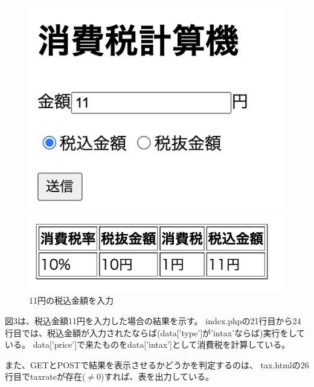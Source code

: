 \documentclass[12pt]{jarticle}
\begin{document}
\begin{figure}[h]
    \begin{minipage}{0.5\hsize}
        \begin{center}
            \includegraphics[scale=0.3]{kadai2_1_4.png}
        \end{center}
    \end{minipage}
    \begin{minipage}{0.5\hsize}
        \begin{center}
            \includegraphics[scale=0.4]{kadai2_1_5.png}
        \end{center}
    \end{minipage}
    \caption{11円の税込金額を入力}
\end{figure}

図3は、税込金額11円を入力した場合の結果を示す。
index.phpの21行目から24行目では、税込金額が入力されたならば(data['type']が'intax'ならば)実行をしている。
data['price']で来たものをdata['intax']として消費税を計算している。

また、GETとPOSTで結果を表示させるかどうかを判定するのは、
tax.htmlの26行目でtaxrateが存在($\neq 0$)すれば、表を出力している。
\end{document}
